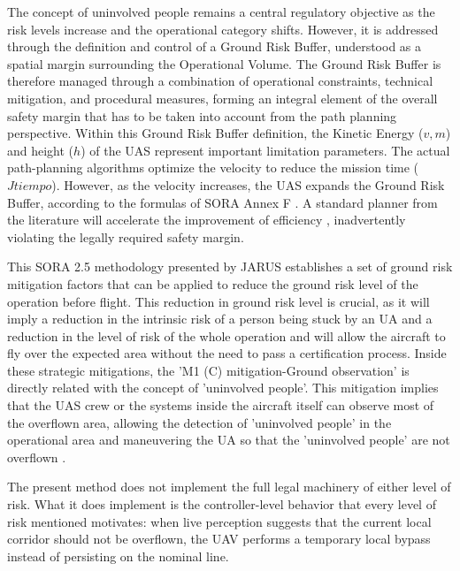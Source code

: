 \documentclass[a4paper,11pt]{article}
\begin{document}
The concept of uninvolved people remains a central regulatory objective as the risk levels increase and the operational category shifts. However, it is addressed through the definition and control of a Ground Risk Buffer, understood as a spatial margin surrounding the Operational Volume. The Ground Risk Buffer is therefore managed through a combination of operational constraints, technical mitigation, and procedural measures, forming an integral element of the overall safety margin that has to be taken into account from the path planning perspective. Within this Ground Risk Buffer definition, the Kinetic Energy ($v, m$) and height ($h$) of the UAS represent important limitation parameters. The actual path-planning algorithms optimize the velocity to reduce the mission time ($J{tiempo}$). However, as the velocity increases, the UAS expands the Ground Risk Buffer, according to the formulas of SORA Annex F \cite{JARUS_SORA_2_5_2024}. A standard planner from the literature will accelerate the improvement of efficiency \cite{dong2017efficient}, inadvertently violating the legally required safety margin.

This SORA 2.5 methodology presented by JARUS establishes a set of ground risk mitigation factors that can be applied to reduce the ground risk level of the operation before flight. This reduction in ground risk level is crucial, as it will imply a reduction in the intrinsic risk of a person being stuck by an UA and a reduction in the level of risk of the whole operation and will allow the aircraft to fly over the expected area without the need to pass a certification process.
Inside these strategic mitigations, the 'M1 (C) mitigation-Ground observation' is directly related with the concept of 'uninvolved people'. This mitigation implies that the UAS crew or the systems inside the aircraft itself can observe most of the overflown area, allowing the detection of 'uninvolved people' in the operational area and maneuvering the UA so that the 'uninvolved people' are not overflown \cite{EASA_AMC_GM_SORA25_2025}.

 The present method does not implement the full legal machinery of either level of risk. What it does implement is the controller-level behavior that every level of risk mentioned motivates: when live perception suggests that the current local corridor should not be overflown, the UAV performs a temporary local bypass instead of persisting on the nominal line.
\end{document}
